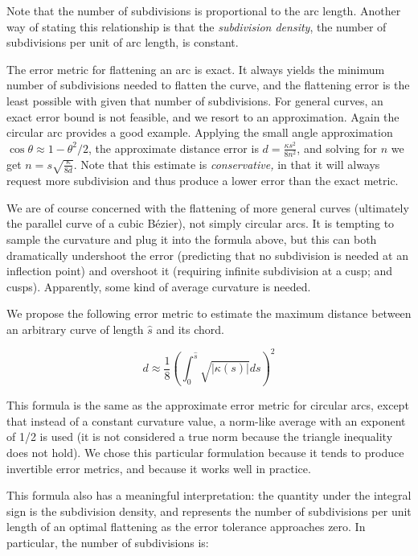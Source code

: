 \documentclass[sigconf, authordraft]{acmart}
\begin{document}
Note that the number of subdivisions is proportional to the arc length. Another way of stating this relationship is that the \emph{subdivision density}, the number of subdivisions per unit of arc length, is constant.

The error metric for flattening an arc is exact. It always yields the minimum number of subdivisions needed to flatten the curve, and the flattening error is the least possible with given that number of subdivisions. For general curves, an exact error bound is not feasible, and we resort to an approximation. Again the circular arc provides a good example. Applying the small angle approximation $\cos \theta \approx 1 - \theta^2/2$, the approximate distance error is $d = \frac{\kappa s^2}{8n^2}$, and solving for $n$ we get $n = s\sqrt{\frac{\kappa}{8d}}$. Note that this estimate is \emph{conservative,} in that it will always request more subdivision and thus produce a lower error than the exact metric.

We are of course concerned with the flattening of more general curves (ultimately the parallel curve of a cubic Bézier), not simply circular arcs. It is tempting to sample the curvature and plug it into the formula above, but this can both dramatically undershoot the error (predicting that no subdivision is needed at an inflection point) and overshoot it (requiring infinite subdivision at a cusp; and cusps). Apparently, some kind of average curvature is needed.

We propose the following error metric to estimate the maximum distance between an arbitrary curve of length $\hat{s}$ and its chord. 

\[
    d \approx \frac{1}{8}\left(\int_0^{\hat{s}} \sqrt{|\kappa(s)|}ds \right)^2
\]


This formula is the same as the approximate error metric for circular arcs, except that instead of a constant curvature value, a norm-like average with an exponent of 1/2 is used (it is not considered a true norm because the triangle inequality does not hold). We chose this particular formulation because it tends to produce invertible error metrics, and because it works well in practice.

This formula also has a meaningful interpretation: the quantity under the integral sign is the subdivision density, and represents the number of subdivisions per unit length of an optimal flattening as the error tolerance approaches zero. In particular, the number of subdivisions is:
\end{document}
